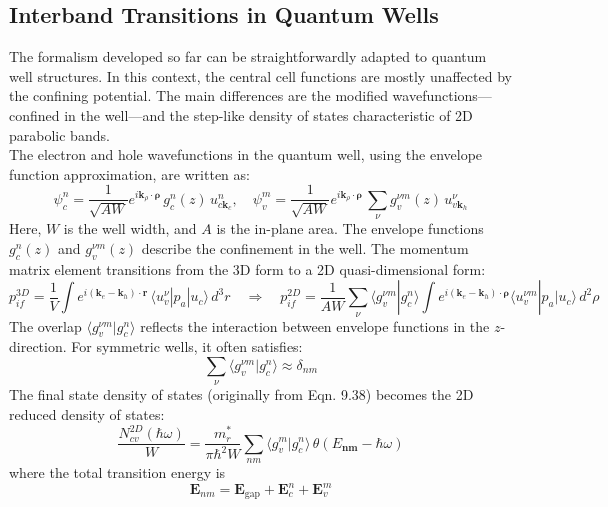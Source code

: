 \subsection{Interband Transitions in Quantum Wells}
The formalism developed so far can be straightforwardly adapted to quantum well structures. In this context, the central cell functions are mostly unaffected by the confining potential. The main differences are the modified wavefunctions—confined in the well—and the step-like density of states characteristic of 2D parabolic bands.\\
The electron and hole wavefunctions in the quantum well, using the envelope function approximation, are written as:
\begin{equation}
	\psi^n_c = \frac{1}{\sqrt{AW}} e^{i \mathbf{k}_\rho \cdot \mathbf{\rho}}\, g_c^n(z)\, u_{c \mathbf{k}_c}^n, \quad
	\psi^m_v = \frac{1}{\sqrt{AW}} e^{i \mathbf{k}_\rho \cdot \mathbf{\rho}}\, \sum_\nu g_v^{\nu m}(z)\, u_{v \mathbf{k}_h}^\nu
\end{equation}
Here, \(W\) is the well width, and \(A\) is the in-plane area. The envelope functions \(g_c^n(z)\) and \(g_v^{\nu m}(z)\) describe the confinement in the well. The momentum matrix element transitions from the 3D form to a 2D quasi-dimensional form:
\begin{equation}
	p^{3D}_{if} = \frac{1}{V} \int e^{i(\mathbf{k}_e - \mathbf{k}_h) \cdot \mathbf{r}}\, \langle u_v^{\nu} | p_a | u_c \rangle\, d^3r
	\quad \Rightarrow \quad
	p^{2D}_{if} = \frac{1}{AW} \sum_\nu \langle g_v^{\nu m} | g_c^n \rangle
	\int e^{i(\mathbf{k}_e - \mathbf{k}_h) \cdot \boldsymbol{\rho}} \langle u_v^{\nu m} | p_a | u_c \rangle\, d^2 \rho
\end{equation}
The overlap \(\langle g_v^{\nu m} | g_c^n \rangle\) reflects the interaction between envelope functions in the \(z\)-direction. For symmetric wells, it often satisfies:
\begin{equation}
	\sum_\nu \langle g_v^{\nu m} | g_c^n \rangle \approx \delta_{nm}
\end{equation}
The final state density of states (originally from Eqn. 9.38) becomes the 2D reduced density of states:
\begin{equation}
	\frac{N_{cv}^{2D}(\hbar \omega)}{W} = \frac{m_r^*}{\pi \hbar^2 W} \sum_{nm} \langle g_v^m | g_c^n \rangle\, \theta(E_\textbf{nm} - \hbar \omega)
\end{equation}
where the total transition energy is
\begin{equation}
	\textbf{E}_{nm} = \textbf{E}_{\text{gap}} + \textbf{E}_c^n + \textbf{E}_v^m
\end{equation}
